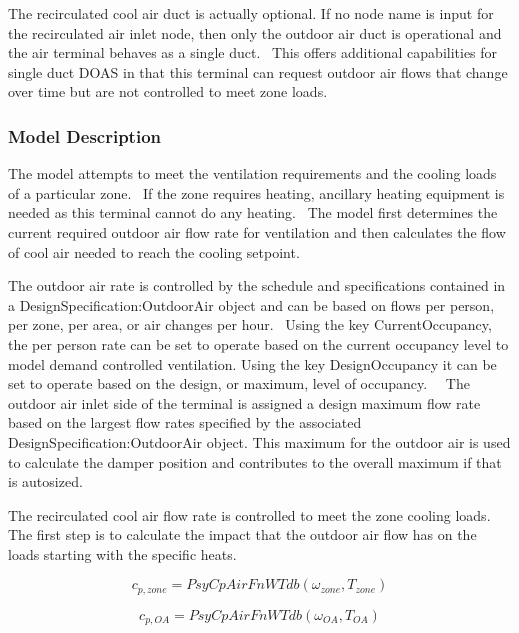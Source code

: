 The recirculated cool air duct is actually optional. If no node name is input for the recirculated air inlet node, then only the outdoor air duct is operational and the air terminal behaves as a single duct.~ This offers additional capabilities for single duct DOAS in that this terminal can request outdoor air flows that change over time but are not controlled to meet zone loads.

\subsubsection{Model Description}\label{model-description-4-000}

The model attempts to meet the ventilation requirements and the cooling loads of a particular zone.~ If the zone requires heating, ancillary heating equipment is needed as this terminal cannot do any heating.~ The model first determines the current required outdoor air flow rate for ventilation and then calculates the flow of cool air needed to reach the cooling setpoint.

The outdoor air rate is controlled by the schedule and specifications contained in a DesignSpecification:OutdoorAir object and can be based on flows per person, per zone, per area, or air changes per hour.~ Using the key CurrentOccupancy, the per person rate can be set to operate based on the current occupancy level to model demand controlled ventilation. Using the key DesignOccupancy it can be set to operate based on the design, or maximum, level of occupancy.~~ The outdoor air inlet side of the terminal is assigned a design maximum flow rate based on the largest flow rates specified by the associated DesignSpecification:OutdoorAir object. This maximum for the outdoor air is used to calculate the damper position and contributes to the overall maximum if that is autosized.

The recirculated cool air flow rate is controlled to meet the zone cooling loads.~ The first step is to calculate the impact that the outdoor air flow has on the loads starting with the specific heats.

\begin{equation}
{c_{p,zone}} = PsyCpAirFnWTdb\left( {{\omega_{zone}},{T_{zone}}} \right)
\end{equation}

\begin{equation}
{c_{p,OA}} = PsyCpAirFnWTdb\left( {{\omega_{OA}},{T_{OA}}} \right)
\end{equation}

